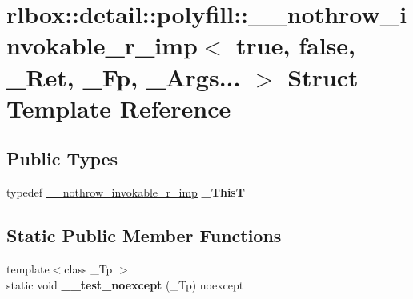 \hypertarget{structrlbox_1_1detail_1_1polyfill_1_1____nothrow__invokable__r__imp_3_01true_00_01false_00_01__R20797f25b6d2c31e27d840915001dc22}{}\section{rlbox\+:\+:detail\+:\+:polyfill\+:\+:\+\_\+\+\_\+nothrow\+\_\+invokable\+\_\+r\+\_\+imp$<$ true, false, \+\_\+\+Ret, \+\_\+\+Fp, \+\_\+\+Args... $>$ Struct Template Reference}
\label{structrlbox_1_1detail_1_1polyfill_1_1____nothrow__invokable__r__imp_3_01true_00_01false_00_01__R20797f25b6d2c31e27d840915001dc22}
\subsection*{Public Types}
\begin{DoxyCompactItemize}
\item 
\mbox{\label{structrlbox_1_1detail_1_1polyfill_1_1____nothrow__invokable__r__imp_3_01true_00_01false_00_01__R20797f25b6d2c31e27d840915001dc22_a7a04331f62c0e1f997458058c0abe2de}} 
typedef \hyperlink{structrlbox_1_1detail_1_1polyfill_1_1____nothrow__invokable__r__imp}{\+\_\+\+\_\+nothrow\+\_\+invokable\+\_\+r\+\_\+imp} {\bfseries \+\_\+\+ThisT}
\end{DoxyCompactItemize}
\subsection*{Static Public Member Functions}
\begin{DoxyCompactItemize}
\item 
\mbox{\label{structrlbox_1_1detail_1_1polyfill_1_1____nothrow__invokable__r__imp_3_01true_00_01false_00_01__R20797f25b6d2c31e27d840915001dc22_adc5e761252c44fa3eab6e7f6cd51fac3}} 
{\footnotesize template$<$class \+\_\+\+Tp $>$ }\\static void {\bfseries \+\_\+\+\_\+test\+\_\+noexcept} (\+\_\+\+Tp) noexcept
\end{DoxyCompactItemize}
